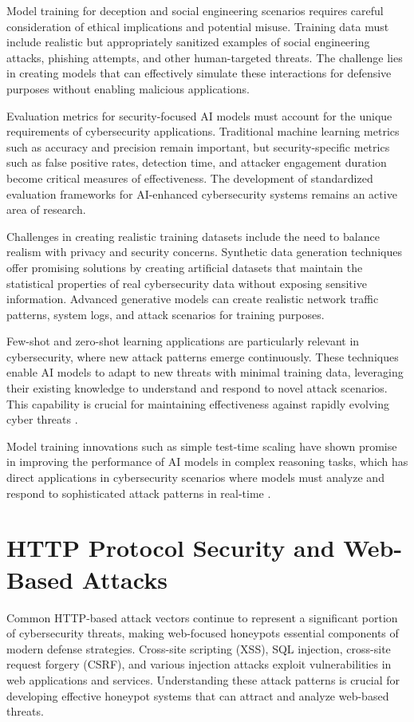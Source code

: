 Model training for deception and social engineering scenarios requires careful consideration of ethical implications and potential misuse. Training data must include realistic but appropriately sanitized examples of social engineering attacks, phishing attempts, and other human-targeted threats. The challenge lies in creating models that can effectively simulate these interactions for defensive purposes without enabling malicious applications.

Evaluation metrics for security-focused AI models must account for the unique requirements of cybersecurity applications. Traditional machine learning metrics such as accuracy and precision remain important, but security-specific metrics such as false positive rates, detection time, and attacker engagement duration become critical measures of effectiveness. The development of standardized evaluation frameworks for AI-enhanced cybersecurity systems remains an active area of research.

Challenges in creating realistic training datasets include the need to balance realism with privacy and security concerns. Synthetic data generation techniques offer promising solutions by creating artificial datasets that maintain the statistical properties of real cybersecurity data without exposing sensitive information. Advanced generative models can create realistic network traffic patterns, system logs, and attack scenarios for training purposes.

Few-shot and zero-shot learning applications are particularly relevant in cybersecurity, where new attack patterns emerge continuously. These techniques enable AI models to adapt to new threats with minimal training data, leveraging their existing knowledge to understand and respond to novel attack scenarios. This capability is crucial for maintaining effectiveness against rapidly evolving cyber threats \cite{muennighoff2025}.

Model training innovations such as simple test-time scaling have shown promise in improving the performance of AI models in complex reasoning tasks, which has direct applications in cybersecurity scenarios where models must analyze and respond to sophisticated attack patterns in real-time \cite{muennighoff2025}.

\section{HTTP Protocol Security and Web-Based Attacks}

Common HTTP-based attack vectors continue to represent a significant portion of cybersecurity threats, making web-focused honeypots essential components of modern defense strategies. Cross-site scripting (XSS), SQL injection, cross-site request forgery (CSRF), and various injection attacks exploit vulnerabilities in web applications and services. Understanding these attack patterns is crucial for developing effective honeypot systems that can attract and analyze web-based threats.

